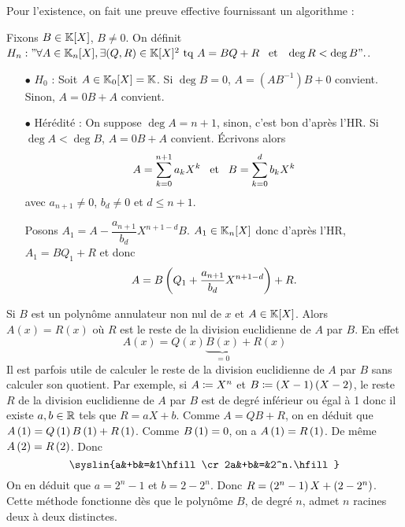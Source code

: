 \documentclass{magnolia}
\begin{document}
  \begin{preuve}
  Pour l'existence, on fait une preuve effective fournissant un algorithme :
  
  Fixons $B\in \polyK$, $B\neq 0$. On définit $H_n : " \forall A \in \polyK[n], \exists (Q,R)\in \polyK^2 \text{ tq } A=BQ+R \et \deg R<\deg B".$.
  \begin{itemize}
  \item[$\bullet$] $H_0$ : Soit $A\in \polyK[0]=\K$. Si $\deg B=0$, $A=(AB^{-1})B+0$ convient. Sinon, $A=0B+A$ convient.
  \item[$\bullet$] Hérédité : On suppose $\deg A=n+1$, sinon, c'est bon d'après l'HR. Si $\deg A<\deg B$, $A=0B+A$ convient.
  \'Ecrivons alors $$A=\sum_{k=0}^{n+1}a_k X^k \quad\!\text{et}\quad\! B=\sum_{k=0}^{d}b_k X^k$$ avec $a_{n+1}\neq 0$, $b_d\neq 0$ et $d\leq n+1$.
  
  Posons $A_1=A-\dfrac{a_{n+1}}{b_d}X^{n+1-d}B$. $A_1\in \polyK[n]$ donc d'après l'HR, $A_1=BQ_1+R$ et donc $$A=B\left(Q_1+\dfrac{a_{n+1}}{b_d}X^{n+1-d}\right)+R.$$
  \end{itemize}
  \end{preuve}
  
  \begin{remarques}
  \remarque Si $B$ est un polynôme annulateur non nul de $x$ et $A\in\polyK$.
    Alors $A(x)=R(x)$ où $R$ est le reste de la division euclidienne de $A$
    par $B$. En effet
    \[A(x)=Q(x)\underbrace{B(x)}_{=0}+R(x)\]
  \exo Il est parfois utile de calculer le reste de la division euclidienne
    de $A$ par $B$ sans calculer son quotient.
      Par exemple, si $A\coloneqq X^n$
      et $B\coloneqq \left(X-1\right)\left(X-2\right)$, le reste $R$ de la division euclidienne de $A$ par $B$
      est de degré inférieur ou égal à 1 donc il existe $a,b\in\mathbb{R}$ tels que
      $R=aX+b$. Comme $A=QB+R$, on en déduit que
      $A\left(1\right)=Q\left(1\right)B\left(1\right)+R\left(1\right)$. Comme $B\left(1\right)=0$, on a $A\left(1\right)=R\left(1\right)$. De
      même $A\left(2\right)=R\left(2\right)$. Donc
      \[\syslin{a&+b&=&1\hfill\cr
               2a&+b&=&2^n.\hfill}\]
      On en déduit que $a=2^n-1$ et $b=2-2^n$. Donc $R=\left(2^n-1\right)X+\left(2-2^n\right)$.
      Cette méthode fonctionne dès que le polynôme $B$, de degré $n$, admet $n$
      racines deux à deux distinctes.
  \end{remarques}
  
\end{document}
